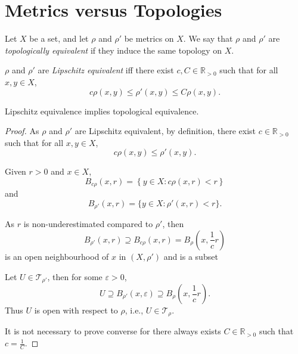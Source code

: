 \section{Metrics versus Topologies}


\begin{definition}
	Let $X$ be a set, and let $\rho$ and $\rho'$ be metrics on $X$. We say that $\rho$ and $\rho'$ are \textit{topologically equivalent} if they induce the same topology on $X$.
\end{definition}


\begin{definition}
	$\rho $ and $\rho'$ are \textit{Lipschitz equivalent} iff there exist $c, C \in \mathbb R_{>0}$ such that for all $x,y \in X$,
	$$
	c \rho(x,y) \le \rho'(x,y) \le C\rho(x,y).
	$$
\end{definition}


\begin{lemma}
	Lipschitz equivalence implies topological equivalence.
\end{lemma}

\begin{proof}
	As $\rho$ and $\rho'$ are Lipschitz equivalent, by definition, there exist $c \in \mathbb R_{>0}$ such that for all $x,y \in X$,
	$$
	c \rho(x, y) \le \rho'(x, y).
	$$
	
	Given $r > 0$ and $x \in X$,
	$$
	B_{c\rho}(x, r) = \left\{ y \in X : c\rho(x, r) < r \right\}
	$$
	and
	$$
	B_{\rho'}(x,r) = \{ y \in X : \rho'(x,r) < r \}.
	$$
	
	As $r$ is non-underestimated compared to $\rho'$, then
	$$
	B_{\rho'}(x,r) \supseteq B_{c\rho}(x, r) = B_{\rho}\left(x, \frac{1}{c}r \right)
	$$
	is an open neighbourhood of $x$ in $(X, \rho')$ and is a subset
	
	Let $U \in \mathcal T_{\rho'}$, then for some $\varepsilon > 0$,
	$$
	U \supseteq B_{\rho'} (x, \varepsilon) \supseteq B_{\rho}\left( x, \frac{1}{c}r \right).
	$$
	Thus $U$ is open with respect to $\rho$, i.e., $U \in \mathcal T_{\rho}$.
	
	It is not necessary to prove converse for there always exists $C \in \mathbb R_{>0}$ such that $c = \frac{1}{C}$.
\end{proof}


